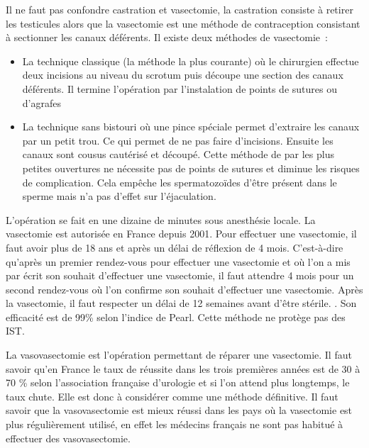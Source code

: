 \documentclass[12pt,a4paper]{report}
\begin{document}
Il ne faut pas confondre castration et vasectomie, la castration consiste à retirer les testicules alors que la vasectomie est une méthode de contraception consistant à sectionner les canaux déférents.
Il existe deux méthodes de vasectomie :
\begin{itemize}
    \item La technique classique (la méthode la plus courante) où le chirurgien effectue deux incisions au niveau du scrotum puis découpe une section des canaux déférents. Il termine l'opération par l'instalation de points de sutures ou d'agrafes \cites{VasectomieToutSavoir2017}{guillaumedaudinContraceptesEnqueteDernier2022}
    \item La technique sans bistouri où une pince spéciale permet d'extraire les canaux par un petit trou. Ce qui permet de ne pas faire d'incisions. Ensuite les canaux sont cousus cautérisé et découpé. Cette méthode de par les plus petites ouvertures ne nécessite pas de points de sutures et diminue les risques de complication. \cites{VasectomieToutSavoir2017}{guillaumedaudinContraceptesEnqueteDernier2022} Cela empêche les spermatozoïdes d'être présent dans le sperme mais n'a pas d'effet sur l'éjaculation.
\end{itemize}
L'opération se fait en une dizaine de minutes sous anesthésie locale. \cite{VasectomieEstelleReversible}
La vasectomie est autorisée en France depuis 2001. \cite{guillaumedaudinContraceptesEnqueteDernier2022} Pour effectuer une vasectomie, il faut avoir plus de 18 ans et après un délai de réflexion de 4 mois. C'est-à-dire qu'après un premier rendez-vous pour effectuer une vasectomie et où l'on a mis par écrit son souhait d'effectuer une vasectomie, il faut attendre 4 mois pour un second rendez-vous où l'on confirme son souhait d'effectuer une vasectomie. \cite{SterilisationViseeContraceptive}
Après la vasectomie, il faut respecter un délai de 12 semaines avant d'être stérile. \cite{associationfrancaisedurologieVasectomieContraceptive2012}. Son efficacité est de 99\% selon l'indice de Pearl. \cite{EfficaciteMoyensContraceptifs}
Cette méthode ne protège pas des IST.

La vasovasectomie est l'opération permettant de réparer une vasectomie. Il faut savoir qu'en France le taux de réussite dans les trois premières années est de 30 à 70 \% selon l'association française d'urologie et si l'on attend plus longtemps, le taux chute. Elle est donc à considérer comme une méthode définitive.\cite{VasectomieEstelleReversible}
Il faut savoir que la vasovasectomie est mieux réussi dans les pays où la vasectomie est plus régulièrement utilisé, en effet les médecins français ne sont pas habitué à effectuer des vasovasectomie. \cite{guillaumedaudinContraceptesEnqueteDernier2022}
\end{document}
